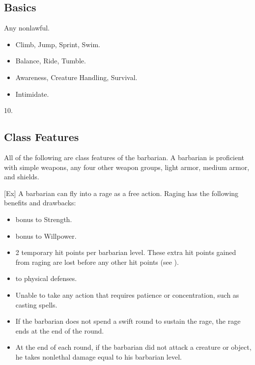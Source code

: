 \subsection{Basics}

 Any nonlawful.

\begin{itemize}
    \item {} Climb, Jump, Sprint, Swim.
    \item {} Balance, Ride, Tumble.
    \item {} Awareness, Creature Handling, Survival.
    \item {} Intimidate.
\end{itemize}

 10.

\subsection{Class Features}

All of the following are class features of the barbarian.
 A barbarian is proficient with simple weapons, any four other weapon groups, light armor, medium armor, and shields.

[Ex]
A barbarian can fly into a rage as a free action.
Raging has the following benefits and drawbacks:
\begin{itemize}
    \item {} bonus to Strength.
    \item {} bonus to Willpower.
    \item 2 temporary hit points per barbarian level.
        These extra hit points gained from raging are lost before any other hit points (see ).
    \item {} to physical defenses.
    \item Unable to take any action that requires patience or concentration, such as casting spells.
    \item If the barbarian does not spend a swift round to sustain the rage, the rage ends at the end of the round.
    \item At the end of each round, if the barbarian did not attack a creature or object, he takes nonlethal damage equal to his barbarian level.
\end{itemize}

